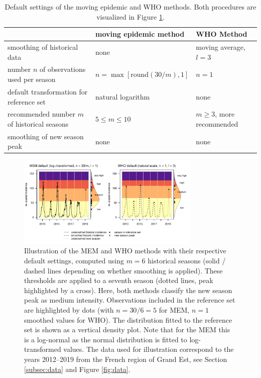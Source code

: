 \documentclass[12pt]{article}
\begin{document}
\begin{table}[h]
\caption{Default settings of the moving epidemic and WHO methods. Both procedures are visualized in Figure \ref{fig:illustration}.}
\label{tab:differences}
\begin{center}
\footnotesize
\begin{tabular}{lll}
\toprule
& moving epidemic method & WHO Method \\
\midrule
smoothing of historical data & none & moving average, $l = 3$\\
number $n$ of observations used per season & $n = \max[\text{round}(30/m), 1]$ & $n = 1$\\
default transformation for reference set & natural logarithm & none\\
recommended number $m$ of historical seasons & $5 \leq m \leq 10$ & $m \geq 3$, more recommended\\
smoothing of new season peak & none & none\\
\bottomrule
\end{tabular}
\end{center}

\end{table}


\begin{figure}
\begin{center}
\includegraphics[width = 0.78\textwidth]{figure/illustration_mem_who.pdf}
\end{center}
\caption{Illustration of the MEM and WHO methods with their respective default settings, computed using $m = 6$ historical seasons (solid / dashed lines depending on whether smoothing is applied). These thresholds are applied to a seventh season (dotted lines, peak highlighted by a cross). Here, both methods classify the new season peak as medium intensity. Observations included in the reference set are highlighted by dots (with $n = 30/6 = 5$ for MEM, $n = 1$ smoothed values for WHO). The distribution fitted to the reference set is shown as a vertical density plot. Note that for the MEM this is a log-normal as the normal distribution is fitted to log-transformed values. The data used for illustration correspond to the years 2012--2019 from the French region of Grand Est, see Section \ref{subsec:data} and Figure \ref{fig:data}.}
\label{fig:illustration}
\end{figure}
\end{document}
